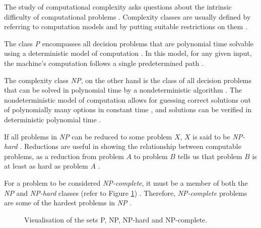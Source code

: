 \documentclass[a4paper, 12pt]{extreport}
\begin{document}
	The study of computational complexity asks questions about the intrinsic difficulty of computational problems \cite{cc:conceptual-perspective}. Complexity classes are usually defined by referring to computation models and by putting suitable restrictions on them \cite{uniform-cc}. 
	
	The class \textit{P} encompasses all decision problems that are polynomial time solvable using a deterministic model of computation \cite{cc:modern}. In this model, for any given input, the machine's computation follows a single predetermined path \cite{sipser-intro-to-computation}. 
	
	The complexity class \textit{NP}, on the other hand is the class of all decision problems that can be solved in polynomial time by a nondeterministic algorithm \cite{computers-and-intractability}. The nondeterministic model of computation allows for guessing correct solutions out of polynomially many options in constant time \cite{npcompleteness}, and solutions can be verified in deterministic polynomial time \cite{sipser-intro-to-computation}.
	
	If all problems in \textit{NP} can be reduced to some problem $X$, $X$ is said to be \textit{NP-hard} \cite{sipser-intro-to-computation}. Reductions are useful in showing the relationship between computable problems, as a reduction from problem $A$ to problem $B$ tells us that problem $B$ is at least as hard as problem $A$ \cite{npcompleteness}.
	
	For a problem to be considered \textit{NP-complete}, it must be a member of both the \textit{NP} and \textit{NP-hard} classes (refer to Figure \ref{fig:p,np,npcomplete}) \cite{npcompleteness}. Therefore, \textit{NP-complete} problems are some of the hardest problems in \textit{NP} \cite{cc:modern}.
	
	\begin{figure}
		\centering
		\begin{adjustbox}{max width=\linewidth}
		\end{adjustbox}
		\caption{\centering Visualisation of the sets P, NP, NP-hard and NP-complete.}
		\label{fig:p,np,npcomplete}
	\end{figure}
	
\end{document}
